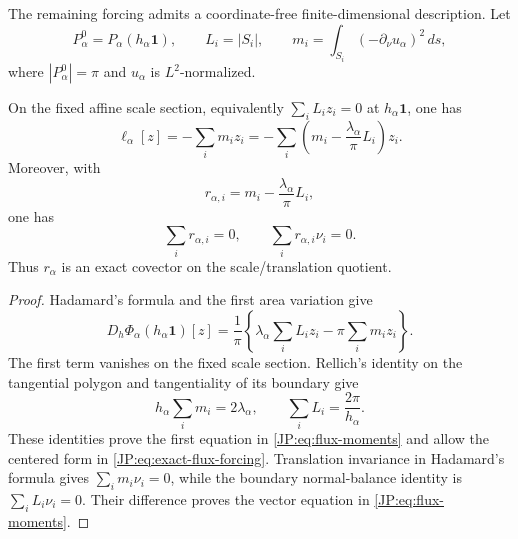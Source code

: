 The remaining forcing admits a coordinate-free finite-dimensional
description.  Let
\begin{equation}\label{JP:eq:side-masses}
 P_\alpha^0=P_\alpha(h_\alpha\mathbf1),\qquad
 L_i=|S_i|,\qquad
 m_i=\int_{S_i}(-\partial_\nu u_\alpha)^2\,ds,
\end{equation}
where $|P_\alpha^0|=\pi$ and $u_\alpha$ is $L^2$-normalized.

\begin{proposition}
\label{JP:prop:flux-forcing}
On the fixed affine scale section, equivalently
\(
 \sum_iL_i z_i=0
\)
at $h_\alpha\mathbf1$, one has
\begin{equation}\label{JP:eq:exact-flux-forcing}
 \boxed{
 \ell_\alpha[z]
 =-\sum_i m_i z_i
 =-\sum_i\left(m_i-\frac{\lambda_\alpha}{\pi}L_i\right)z_i.}
\end{equation}
Moreover, with
\begin{equation}\label{JP:eq:centered-flux}
 r_{\alpha,i}=m_i-\frac{\lambda_\alpha}{\pi}L_i,
\end{equation}
one has
\begin{equation}\label{JP:eq:flux-moments}
 \sum_i r_{\alpha,i}=0,
 \qquad
 \sum_i r_{\alpha,i}\nu_i=0.
\end{equation}
Thus $r_\alpha$ is an exact covector on the scale/translation quotient.
\end{proposition}

\begin{proof}
Hadamard's formula and the first area variation give
\[
 D_h\Phi_\alpha(h_\alpha\mathbf1)[z]
 =\frac1\pi\left\{
 \lambda_\alpha\sum_iL_i z_i-\pi\sum_i m_i z_i\right\}.
\]
The first term vanishes on the fixed scale section.  Rellich's identity
on the tangential polygon and tangentiality of its boundary give
\[
 h_\alpha\sum_i m_i=2\lambda_\alpha,
 \qquad
 \sum_iL_i=\frac{2\pi}{h_\alpha}.
\]
These identities prove the first equation in \eqref{JP:eq:flux-moments} and
allow the centered form in \eqref{JP:eq:exact-flux-forcing}.  Translation
invariance in Hadamard's formula gives
$\sum_i m_i\nu_i=0$, while the boundary normal-balance identity is
$\sum_iL_i\nu_i=0$.  Their difference proves the vector equation in
\eqref{JP:eq:flux-moments}.
\end{proof}

